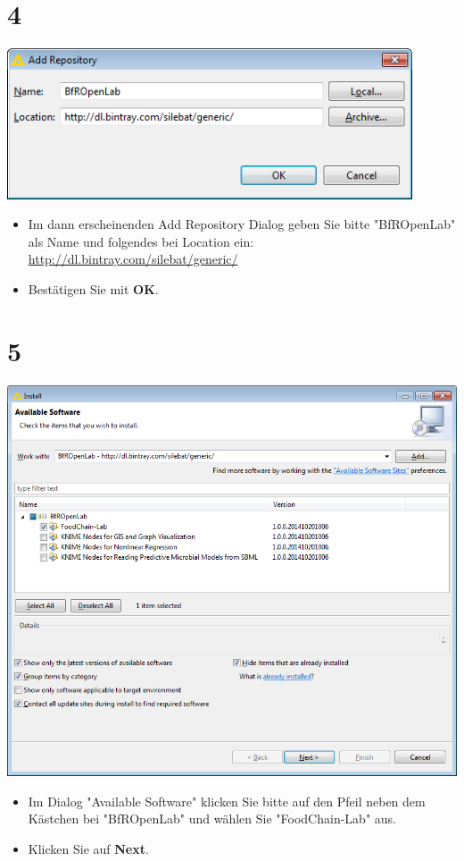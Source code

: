 \documentclass{beamer}
\begin{document}
\section{4}
\begin{frame}
	\begin{center}
  		\includegraphics[width=0.9\textwidth]{4.png}
	\end{center}
	\begin{itemize}
		\item Im dann erscheinenden Add Repository Dialog geben Sie bitte "BfROpenLab" als Name und folgendes bei Location ein: \url{http://dl.bintray.com/silebat/generic/}
		\item Bestätigen Sie mit \textbf{OK}.
	\end{itemize}
\end{frame}

\section{5}
\begin{frame}
	\begin{center}
  		\includegraphics[height=0.7\textheight]{5.png}
	\end{center}
	\begin{itemize}
		\item Im Dialog "Available Software" klicken Sie bitte auf den Pfeil neben dem Kästchen bei "BfROpenLab" und wählen Sie "FoodChain-Lab" aus.
		\item Klicken Sie auf \textbf{Next}.
	\end{itemize}
\end{frame}
\end{document}
